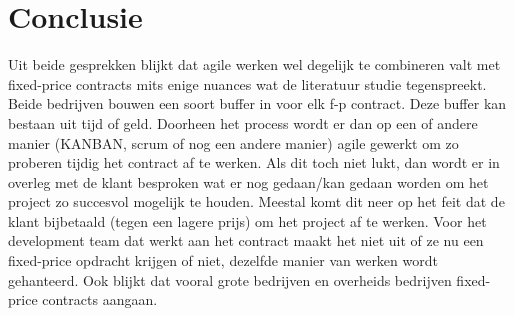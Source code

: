 \documentclass{hogent-article}
\begin{document}
	
	\section{Conclusie}
	Uit beide gesprekken blijkt dat agile werken wel degelijk te combineren valt met fixed-price contracts mits enige nuances wat de literatuur studie tegenspreekt. Beide bedrijven bouwen een soort buffer in voor elk f-p contract. Deze buffer kan bestaan uit tijd of geld. Doorheen het process wordt er dan op een of andere manier (KANBAN, scrum of nog een andere manier) agile gewerkt om zo proberen tijdig het contract af te werken. Als dit toch niet lukt, dan wordt er in overleg met de klant besproken wat er nog gedaan/kan gedaan worden om het project zo succesvol mogelijk te houden. Meestal komt dit neer op het feit dat de klant bijbetaald (tegen een lagere prijs) om het project af te werken. Voor het development team dat werkt aan het contract maakt het niet uit of ze nu een fixed-price opdracht krijgen of niet, dezelfde manier van werken wordt gehanteerd. Ook blijkt dat vooral grote bedrijven en overheids bedrijven fixed-price contracts aangaan.

	
	
	\printbibliography[heading=bibintoc]
	
\end{document}
